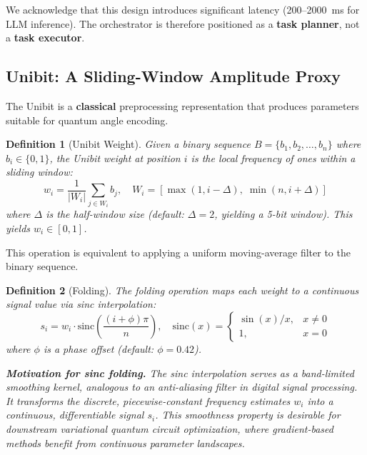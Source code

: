 ﻿\documentclass[12pt,a4paper]{article}
\newtheorem{definition}{Definition}[section]
\begin{document}
We acknowledge that this design introduces significant latency (200--2000~ms for LLM inference). The orchestrator is therefore positioned as a \textbf{task planner}, not a \textbf{task executor}.

\subsection{Unibit: A Sliding-Window Amplitude Proxy}\label{sec:unibit}

The Unibit is a \textbf{classical} preprocessing representation that produces parameters suitable for quantum angle encoding.

\begin{definition}[Unibit Weight]
Given a binary sequence $B = \{b_1, b_2, \dots, b_n\}$ where $b_i \in \{0, 1\}$, the Unibit weight at position $i$ is the local frequency of ones within a sliding window:
\begin{equation}
    w_i = \frac{1}{|W_i|} \sum_{j \in W_i} b_j, \quad W_i = [\max(1, i - \Delta),\; \min(n, i + \Delta)]
\end{equation}
where $\Delta$ is the half-window size (default: $\Delta = 2$, yielding a 5-bit window). This yields $w_i \in [0, 1]$.
\end{definition}

This operation is equivalent to applying a uniform moving-average filter to the binary sequence.

\begin{definition}[Folding]
The folding operation maps each weight to a continuous signal value via sinc interpolation:
\begin{equation}
    s_i = w_i \cdot \mathrm{sinc}\!\left(\frac{(i + \phi)\pi}{n}\right), \quad \mathrm{sinc}(x) = \begin{cases} \sin(x)/x, & x \neq 0 \\ 1, & x = 0 \end{cases}
\end{equation}
where $\phi$ is a phase offset (default: $\phi = 0.42$).

\textbf{Motivation for sinc folding.} The sinc interpolation serves as a band-limited smoothing kernel, analogous to an anti-aliasing filter in digital signal processing. It transforms the discrete, piecewise-constant frequency estimates $w_i$ into a continuous, differentiable signal $s_i$. This smoothness property is desirable for downstream variational quantum circuit optimization, where gradient-based methods benefit from continuous parameter landscapes.
\end{definition}
\end{document}
